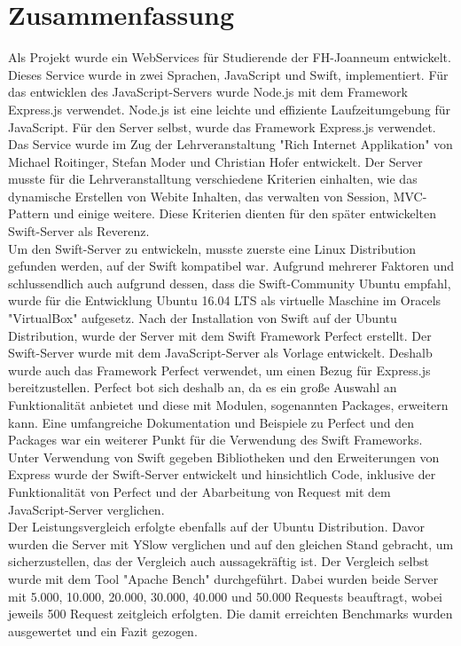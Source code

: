 \chapter{Zusammenfassung}
\label{chap:Zusammenfassung}

\chapterstart

Als Projekt wurde ein WebServices für Studierende der FH-Joanneum entwickelt. Dieses Service wurde in zwei Sprachen, JavaScript und Swift, implementiert. Für das entwicklen des JavaScript-Servers wurde Node.js mit dem Framework Express.js verwendet. Node.js ist eine leichte und effiziente Laufzeitumgebung für JavaScript. Für den Server selbst, wurde das Framework Express.js verwendet. Das Service wurde im Zug der Lehrveranstaltung "Rich Internet Applikation" von Michael Roitinger, Stefan Moder und Christian Hofer entwickelt. Der Server musste für die Lehrveranstalltung verschiedene Kriterien einhalten, wie das dynamische Erstellen von Webite Inhalten, das verwalten von Session, MVC-Pattern und einige weitere. Diese Kriterien dienten für den später entwickelten Swift-Server als Reverenz.\\
Um den Swift-Server zu entwickeln, musste zuerste eine Linux Distribution gefunden werden, auf der Swift kompatibel war. Aufgrund mehrerer Faktoren und schlussendlich auch aufgrund dessen, dass die Swift-Community Ubuntu empfahl, wurde für die Entwicklung Ubuntu 16.04 LTS als virtuelle Maschine im Oracels "VirtualBox" aufgesetz. Nach der Installation von Swift auf der Ubuntu Distribution, wurde der Server mit dem Swift Framework Perfect erstellt. Der Swift-Server wurde mit dem JavaScript-Server als Vorlage entwickelt. Deshalb wurde auch das Framework Perfect verwendet, um einen Bezug für Express.js bereitzustellen. Perfect bot sich deshalb an, da es ein große Auswahl an Funktionalität anbietet und diese mit Modulen, sogenannten Packages, erweitern kann. Eine umfangreiche Dokumentation und Beispiele zu Perfect und den Packages war ein weiterer Punkt für die Verwendung des Swift Frameworks. Unter Verwendung von Swift gegeben Bibliotheken und den Erweiterungen von Express wurde der Swift-Server entwickelt und hinsichtlich Code, inklusive der Funktionalität von Perfect und der Abarbeitung von Request mit dem JavaScript-Server verglichen. \\
Der Leistungsvergleich erfolgte ebenfalls auf der Ubuntu Distribution. Davor wurden die Server mit YSlow verglichen und auf den gleichen Stand gebracht, um sicherzustellen, das der Vergleich auch aussagekräftig ist. Der Vergleich selbst wurde mit dem Tool "Apache Bench" durchgeführt. Dabei wurden beide Server mit 5.000, 10.000, 20.000, 30.000, 40.000 und 50.000 Requests beauftragt, wobei jeweils 500 Request zeitgleich erfolgten. Die damit erreichten Benchmarks wurden ausgewertet und ein Fazit gezogen.\\
